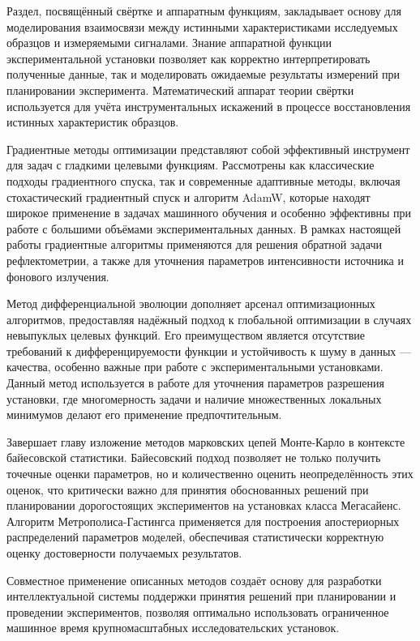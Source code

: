 \documentclass[a4paper]{article}
\begin{document}
Раздел, посвящённый свёртке и аппаратным функциям, закладывает основу для моделирования взаимосвязи между истинными характеристиками исследуемых образцов и измеряемыми сигналами. Знание аппаратной функции экспериментальной установки позволяет как корректно интерпретировать полученные данные, так и моделировать ожидаемые результаты измерений при планировании эксперимента. Математический аппарат теории свёртки используется для учёта инструментальных искажений в процессе восстановления истинных характеристик образцов.

Градиентные методы оптимизации представляют собой эффективный инструмент для задач с гладкими целевыми функциям. Рассмотрены как классические подходы градиентного спуска, так и современные адаптивные методы, включая стохастический градиентный спуск и алгоритм AdamW, которые находят широкое применение в задачах машинного обучения и особенно эффективны при работе с большими объёмами экспериментальных данных. В рамках настоящей работы градиентные алгоритмы применяются для решения обратной задачи рефлектометрии, а также для уточнения параметров интенсивности источника и фонового излучения.

Метод дифференциальной эволюции дополняет арсенал оптимизационных алгоритмов, предоставляя надёжный подход к глобальной оптимизации в случаях невыпуклых целевых функций. Его преимуществом является отсутствие требований к дифференцируемости функции и устойчивость к шуму в данных — качества, особенно важные при работе с экспериментальными установками. Данный метод используется в работе для уточнения параметров разрешения установки, где многомерность задачи и наличие множественных локальных минимумов делают его применение предпочтительным.

Завершает главу изложение методов марковских цепей Монте-Карло в контексте байесовской статистики. Байесовский подход позволяет не только получить точечные оценки параметров, но и количественно оценить неопределённость этих оценок, что критически важно для принятия обоснованных решений при планировании дорогостоящих экспериментов на установках класса Мегасайенс. Алгоритм Метрополиса-Гастингса применяется для построения апостериорных распределений параметров моделей, обеспечивая статистически корректную оценку достоверности получаемых результатов.

Совместное применение описанных методов создаёт основу для разработки интеллектуальной системы поддержки принятия решений при планировании и проведении экспериментов, позволяя оптимально использовать ограниченное машинное время крупномасштабных исследовательских установок.
\end{document}

